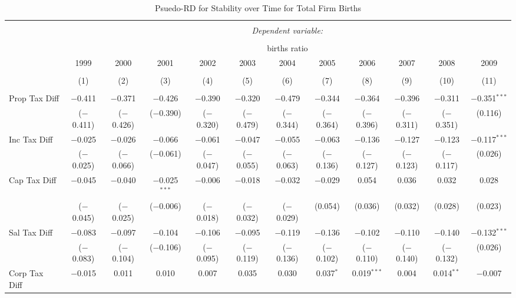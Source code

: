 
\begin{table}[!htbp] \centering 
  \caption{Psuedo-RD for Stability over Time for  Total Firm Births} 
  \label{--year} 
\small 
\begin{tabular}{@{\extracolsep{5pt}}lccccccccccc} 
\\[-1.8ex]\hline 
\hline \\[-1.8ex] 
 & \multicolumn{11}{c}{\textit{Dependent variable:}} \\ 
\cline{2-12} 
\\[-1.8ex] & \multicolumn{11}{c}{births ratio} \\ 
 & 1999 & 2000 & 2001 & 2002 & 2003 & 2004 & 2005 & 2006 & 2007 & 2008 & 2009 \\ 
\\[-1.8ex] & (1) & (2) & (3) & (4) & (5) & (6) & (7) & (8) & (9) & (10) & (11)\\ 
\hline \\[-1.8ex] 
 Prop Tax Diff & $-$0.411 & $-$0.371 & $-$0.426 & $-$0.390 & $-$0.320 & $-$0.479 & $-$0.344 & $-$0.364 & $-$0.396 & $-$0.311 & $-$0.351$^{***}$ \\ 
  & ($-$0.411) & ($-$0.426) & ($-$0.390) & ($-$0.320) & ($-$0.479) & ($-$0.344) & ($-$0.364) & ($-$0.396) & ($-$0.311) & ($-$0.351) & (0.116) \\ 
  Inc Tax Diff & $-$0.025 & $-$0.026 & $-$0.066 & $-$0.061 & $-$0.047 & $-$0.055 & $-$0.063 & $-$0.136 & $-$0.127 & $-$0.123 & $-$0.117$^{***}$ \\ 
  & ($-$0.025) & ($-$0.066) & ($-$0.061) & ($-$0.047) & ($-$0.055) & ($-$0.063) & ($-$0.136) & ($-$0.127) & ($-$0.123) & ($-$0.117) & (0.026) \\ 
  Cap Tax Diff & $-$0.045 & $-$0.040 & $-$0.025$^{***}$ & $-$0.006 & $-$0.018 & $-$0.032 & $-$0.029 & 0.054 & 0.036 & 0.032 & 0.028 \\ 
  & ($-$0.045) & ($-$0.025) & ($-$0.006) & ($-$0.018) & ($-$0.032) & ($-$0.029) & (0.054) & (0.036) & (0.032) & (0.028) & (0.023) \\ 
  Sal Tax Diff & $-$0.083 & $-$0.097 & $-$0.104 & $-$0.106 & $-$0.095 & $-$0.119 & $-$0.136 & $-$0.102 & $-$0.110 & $-$0.140 & $-$0.132$^{***}$ \\ 
  & ($-$0.083) & ($-$0.104) & ($-$0.106) & ($-$0.095) & ($-$0.119) & ($-$0.136) & ($-$0.102) & ($-$0.110) & ($-$0.140) & ($-$0.132) & (0.026) \\ 
  Corp Tax Diff & $-$0.015 & 0.011 & 0.010 & 0.007 & 0.035 & 0.030 & 0.037$^{*}$ & 0.019$^{***}$ & 0.004 & 0.014$^{**}$ & $-$0.007 \\ 

\end{tabular}
\end{table}
